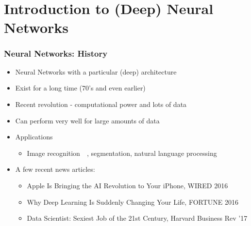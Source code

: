 \documentclass[12pt,fleqn]{beamer}
\begin{document}


\section{Introduction to (Deep) Neural Networks} %
\label{sec:introduction_to_deep_neural_networks}

\begin{frame}\frametitle{{Neural Networks: History}}

\begin{itemize}
	\item Neural Networks with a particular (deep) architecture
    \item Exist for a long time (70's and even earlier)~\cite{Rosenblatt1958,Rumelhart1986,LeCun1990}
    \item Recent revolution - computational power and lots of data~\cite{bengio2009learning,RainaEtAl2009,lecun2015deep}
    \item Can perform very well for large amounts of data
    \item Applications
    \begin{itemize}
    \item Image recognition~~\cite{hinton2012deep,KrizhevskySutskeverHinton2012,lecun2015deep}, segmentation, natural language processing~\cite{BordesEtAl2014,CollobertEtAl2011,  JeanEtAl2014}
    \end{itemize}


    \pause

\item A few recent news articles:

 \begin{itemize}
    \item
{Apple Is Bringing the AI Revolution to Your iPhone, WIRED 2016}
\item
{Why Deep Learning Is Suddenly Changing Your Life,  FORTUNE 2016}
\item Data Scientist: Sexiest Job of the 21st Century, Harvard Business Rev ’17
\end{itemize}

\end{itemize}
\end{frame}
\end{document}
